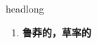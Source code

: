 
\begin{frame}
{\huge headlong}
\begin{center}
\begin{enumerate}\Large
  \item \textbf{鲁莽的，草率的}
\end{enumerate}
\end{center}
\end{frame}
